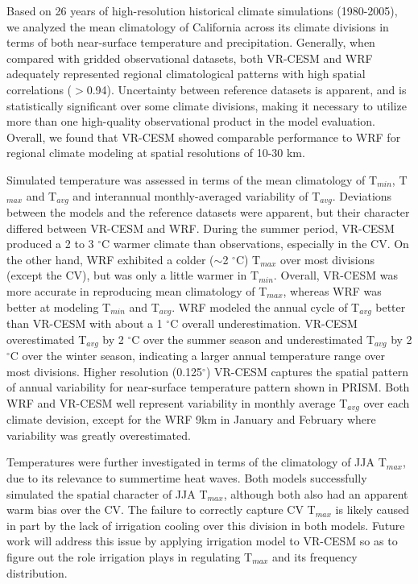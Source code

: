 Based on 26 years of high-resolution historical climate simulations (1980-2005), we analyzed the mean climatology of California across its climate divisions in terms of both near-surface temperature and precipitation. Generally, when compared with gridded observational datasets, both VR-CESM and WRF adequately represented regional climatological patterns with high spatial correlations ($>$0.94). Uncertainty between reference datasets is apparent, and is statistically significant over some climate divisions, making it necessary to utilize more than one high-quality observational product in the model evaluation. Overall, we found that VR-CESM showed comparable performance to WRF for regional climate modeling at spatial resolutions of 10-30 km.

Simulated temperature was assessed in terms of the mean climatology of T$_{min}$, T$_{max}$ and T$_{avg}$ and interannual monthly-averaged variability of T$_{avg}$.  Deviations between the models and the reference datasets were apparent, but their character differed between VR-CESM and WRF. During the summer period, VR-CESM produced a 2 to 3 $^\circ$C warmer climate than observations, especially in the CV. On the other hand, WRF exhibited a colder ($\sim$2 $^\circ$C) T$_{max}$ over most divisions (except the CV), but was only a little warmer in T$_{min}$. Overall, VR-CESM was more accurate in reproducing mean climatology of T$_{max}$, whereas WRF was better at modeling T$_{min}$ and T$_{avg}$. WRF modeled the annual cycle of T$_{avg}$ better than VR-CESM with about a 1 $^\circ$C overall underestimation. VR-CESM overestimated T$_{avg}$ by 2 $^\circ$C over the summer season and underestimated T$_{avg}$ by 2 $^\circ$C over the winter season, indicating a larger annual temperature range over most divisions. Higher resolution (0.125$^\circ$) VR-CESM captures the spatial pattern of annual variability for near-surface temperature pattern shown in PRISM. Both WRF and VR-CESM well represent variability in monthly average T$_{avg}$ over each climate devision, except for the WRF 9km in January and February where variability was greatly overestimated.

Temperatures were further investigated in terms of the climatology of JJA T$_{max}$, due to its relevance to summertime heat waves.  Both models successfully simulated the spatial character of JJA T$_{max}$, although both also had an apparent warm bias over the CV.  The failure to correctly capture CV T$_{max}$ is likely caused in part by the lack of irrigation cooling over this division in both models. Future work will address this issue by applying irrigation model to VR-CESM so as to figure out the role irrigation plays in regulating T$_{max}$ and its frequency distribution.

